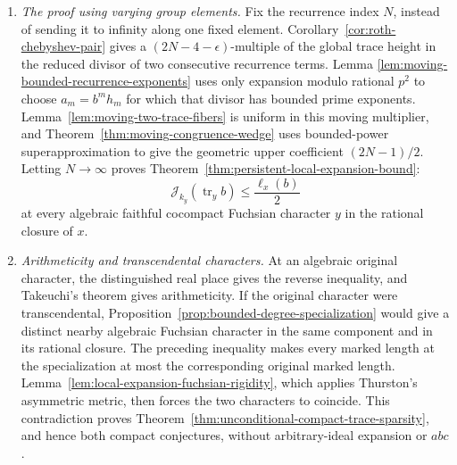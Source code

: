 \documentclass[11pt,reqno]{amsart}
\theoremstyle{definition}
\theoremstyle{remark}
\newcommand{\Tr}{\operatorname{tr}}
\begin{document}
\begin{enumerate}[label=\textbf{\arabic*.},leftmargin=*]
\item \emph{The proof using varying group elements.}
Fix the recurrence index \(N\), instead of sending it to infinity along one
fixed element.  Corollary~\ref{cor:roth-chebyshev-pair} gives a
\((2N-4-\epsilon)\)-multiple of the global trace height in the reduced
divisor of two consecutive recurrence terms.  Lemma
\ref{lem:moving-bounded-recurrence-exponents} uses only expansion modulo
rational \(p^2\) to choose \(a_m=b^mh_m\) for which that divisor has bounded
prime exponents.  Lemma~\ref{lem:moving-two-trace-fibers} is uniform in
this moving multiplier, and Theorem~\ref{thm:moving-congruence-wedge}
uses bounded-power superapproximation to give the geometric upper
coefficient \((2N-1)/2\).  Letting \(N\to\infty\) proves
Theorem~\ref{thm:persistent-local-expansion-bound}:
\[
 \mathcal J_{k_y}(\Tr_yb)\le\frac{\ell_x(b)}2
\]
at every algebraic faithful cocompact Fuchsian character \(y\) in the
rational closure of \(x\).

\item \emph{Arithmeticity and transcendental characters.}
At an algebraic original character, the distinguished real place gives
the reverse inequality, and Takeuchi's theorem \cite{Takeuchi} gives arithmeticity.
If the original character were transcendental,
Proposition~\ref{prop:bounded-degree-specialization} would give a distinct
nearby algebraic Fuchsian character in the same component and in its
rational closure.  The preceding inequality makes every marked length at
the specialization at most the corresponding original marked length.
Lemma~\ref{lem:local-expansion-fuchsian-rigidity}, which applies Thurston's
asymmetric metric, then forces the two characters to coincide.  This
contradiction proves
Theorem~\ref{thm:unconditional-compact-trace-sparsity}, and hence both
compact conjectures, without arbitrary-ideal expansion or \(abc\).


\end{enumerate}
\end{document}
